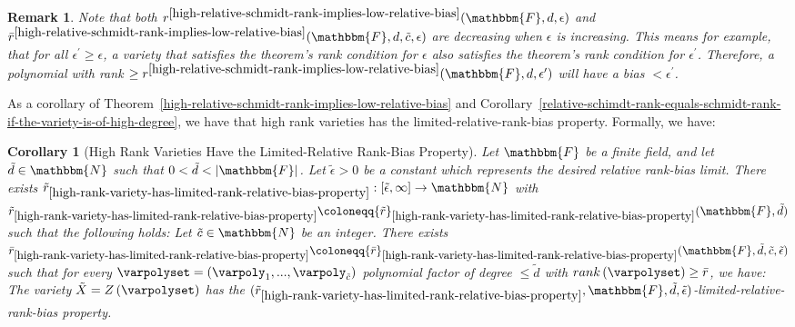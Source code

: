 \documentclass[10pt,a4paper]{article}
\newtheorem{corollary}[theorem]{Corollary}
\newtheorem{remark}[theorem]{Remark}
\newcommand{\definedas}[0]{\coloneqq}
\newcommand{\parens}[1]{\left( #1 \right)}
\newcommand{\basefield}[0]{\mathbbm{F}}
\newcommand{\degree}[0]{d}
\newcommand{\funcdef}[3]{#1:#2\rightarrow#3}
\newcommand{\naturalnumbersset}[0]{\mathbbm{N}}
\newcommand{\variety}{{\tilde{X}}}
\newcommand{\varietypolycount}{{\tilde{c}}}
\newcommand{\varietydeg}[0]{\tilde{\degree}}
\newcommand{\zerofunc}[1]{Z \parens{#1}}
\newcommand{\rank}[1]{rank \parens{#1}}
\newcommand{\rankval}[0]{{{r}}}
\newcommand{\rankbiasfunc}[0]{{\tilde{r}}}
\newcommand{\varietyrankval}[0]{{\bar{r}}}
\newcommand{\epsilonlimitedrankbias}[0]{{\tilde{\epsilon}}}
\newcommand{\abs}[1]{\left| #1 \right|}
\begin{document}
\begin{remark}\label{in-high-relative-rank-implies-low-relative-bias-epsilon-increasing-rank-requirment-decreasing}
Note that both $\rankval^{\ref{high-relative-schmidt-rank-implies-low-relative-bias}}(\basefield, \degree, \epsilon)$
and $\varietyrankval^{\ref{high-relative-schmidt-rank-implies-low-relative-bias}}(\basefield, \degree, \varietypolycount, \epsilon)$
are decreasing when $\epsilon$ is increasing.
This means for example, that for all $\epsilon^\prime \geq \epsilon$,
a variety that satisfies the theorem's rank condition for $\epsilon$ also satisfies the theorem's rank condition for $\epsilon^\prime$.
Therefore, a polynomial with rank $\geq \rankval^{\ref{high-relative-schmidt-rank-implies-low-relative-bias}}(\basefield, \degree, \epsilon^\prime)$
will have a bias $< \epsilon^\prime$.
\end{remark}
As a corollary of Theorem~\ref{high-relative-schmidt-rank-implies-low-relative-bias} and Corollary~\ref{relative-schimdt-rank-equals-schmidt-rank-if-the-variety-is-of-high-degree}, we have that
high rank varieties has the limited-relative-rank-bias property.
Formally, we have:
\begin{corollary}[High Rank Varieties Have the Limited-Relative Rank-Bias Property]\label{high-rank-variety-has-limited-rank-relative-bias-property}
    Let $\basefield$ be a finite field, and let $\varietydeg \in \naturalnumbersset$ such that $0 < \varietydeg < \abs{\basefield}$.
    Let $\epsilonlimitedrankbias > 0$ be a constant which represents the desired relative rank-bias limit.
    There exists $\funcdef{\rankbiasfunc_{\ref{high-rank-variety-has-limited-rank-relative-bias-property}}}{[\epsilonlimitedrankbias, \infty]}{\naturalnumbersset}$ with $\rankbiasfunc_{\ref{high-rank-variety-has-limited-rank-relative-bias-property}} \definedas \rankbiasfunc_{\ref{high-rank-variety-has-limited-rank-relative-bias-property}}(\basefield, \varietydeg)$
    such that the following holds:
    \newline
    Let $\varietypolycount \in \naturalnumbersset$ be an integer.
    There exists $\varietyrankval_{\ref{high-rank-variety-has-limited-rank-relative-bias-property}} \definedas \varietyrankval_{\ref{high-rank-variety-has-limited-rank-relative-bias-property}}(\basefield, \varietydeg, \varietypolycount, \epsilonlimitedrankbias)$ such that
    for every $\varpolyset = (\varpoly_1,...,\varpoly_{\varietypolycount})$ polynomial factor of degree $\leq \varietydeg$ with $\rank{\varpolyset} \geq \varietyrankval$, we have:
    \newline
    The variety $\variety = \zerofunc{\varpolyset}$ has the $(\rankbiasfunc_{\ref{high-rank-variety-has-limited-rank-relative-bias-property}}, \basefield, \varietydeg, \epsilonlimitedrankbias)$-limited-relative-rank-bias property.
\end{corollary}
\end{document}
